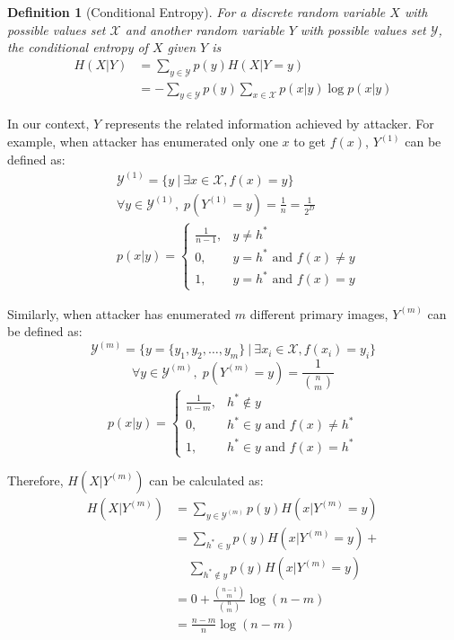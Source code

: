 \documentclass[10pt, conference, compsocconf]{IEEEtran}
\newtheorem{mydef}{Definition}
\begin{document}
		\begin{mydef}[Conditional Entropy]\label{def_con_entropy}
			For a discrete random variable $X$ with
			possible values set $\mathcal X$ and another random
			variable $Y$ with possible values
			set $\mathcal{Y}$, the conditional entropy
			of $X$ given $Y$ is
			\begin{align}
				H(X|Y) &= \sum_{y \in \mathcal Y} p(y) H(X | Y = y)\\
					&= -\sum_{y \in \mathcal Y} p(y) \sum_{x \in \mathcal X} p(x|y) \log p(x|y)
			\end{align}
		\end{mydef}
		
		In our context, $Y$ represents the related information
		achieved by attacker. For example, when attacker has enumerated only one
		$x$ to get $f(x)$, $Y^{(1)}$ can be defined as:
		\begin{align*}
			&\mathcal Y^{(1)} = \{y \: | \: \exists x \in \mathcal X, f(x) = y\}\\
			&\forall y \in \mathcal Y^{(1)}, \; p(Y^{(1)} = y) = \frac{1}{n} = \frac{1}{2^D}\\
			&p(x|y) = \begin{cases}
				\frac{1}{n-1}, &y \neq h^*\\
				0, &y = h^* \text{ and } f(x) \neq y\\
				1, &y = h^* \text{ and } f(x) = y
			\end{cases}
		\end{align*}
		
		Similarly, when attacker has enumerated $m$ different primary images, $Y^{(m)}$ can be defined
		as:
		\begin{equation*}
			\mathcal Y^{(m)} = \{ y = \{y_1, y_2, \ldots, y_m\} \: | \: \exists x_i \in \mathcal X, f(x_i) = y_i\}
		\end{equation*}
		\begin{equation*}
			\forall y \in \mathcal Y^{(m)}, \; p(Y^{(m)} = y) = \frac{1}{\binom{n}{m}}
		\end{equation*}
		\begin{equation*}
			p(x|y) = \begin{cases}
				\frac{1}{n-m}, &h^* \notin y\\
				0, &h^* \in y \text{ and } f(x) \neq h^*\\
				1, &h^* \in y \text{ and } f(x) = h^*
			\end{cases}
		\end{equation*}
		
		Therefore, $H(X | Y^{(m)})$ can be calculated as:
		\begin{align*}
			H(X | Y^{(m)}) &= \sum_{y \in \mathcal Y^{(m)}} p(y) H(x | Y^{(m)} = y)\\
				&= \sum_{h^* \in y} p(y) H(x | Y^{(m)} = y) + \\
					& \;\;\;\; \sum_{h^* \notin y} p(y) H(x | Y^{(m)} = y)\\
				&= 0+\frac{\binom{n-1}{m}}{\binom{n}{m}} \log(n-m)\\
				&= \frac{n-m}{n} \log(n-m)
		\end{align*}
		
\end{document}

